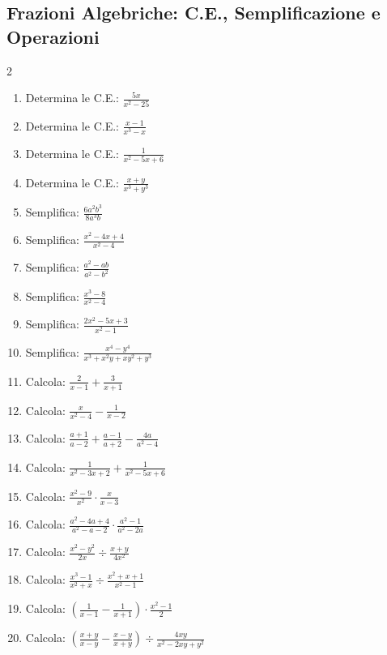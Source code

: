 \subsection{Frazioni Algebriche: C.E., Semplificazione e Operazioni}
\begin{multicols}{2}
\begin{enumerate}
    \item {} Determina le C.E.: $\frac{5x}{x^2 - 25}$
    \item {} Determina le C.E.: $\frac{x-1}{x^3 - x}$
    \item {} Determina le C.E.: $\frac{1}{x^2 - 5x + 6}$
    \item {} Determina le C.E.: $\frac{x+y}{x^3 + y^3}$
    \item {} Semplifica: $\frac{6a^2b^3}{8a^3b}$
    \item {} Semplifica: $\frac{x^2 - 4x + 4}{x^2 - 4}$
    \item {} Semplifica: $\frac{a^2 - ab}{a^2 - b^2}$
    \item {} Semplifica: $\frac{x^3 - 8}{x^2 - 4}$
    \item {} Semplifica: $\frac{2x^2 - 5x + 3}{x^2 - 1}$
    \item {} Semplifica: $\frac{x^4 - y^4}{x^3 + x^2y + xy^2 + y^3}$
    
    \item {} Calcola: $\frac{2}{x-1} + \frac{3}{x+1}$
    \item {} Calcola: $\frac{x}{x^2 - 4} - \frac{1}{x-2}$
    \item {} Calcola: $\frac{a+1}{a-2} + \frac{a-1}{a+2} - \frac{4a}{a^2-4}$
    \item {} Calcola: $\frac{1}{x^2-3x+2} + \frac{1}{x^2-5x+6}$
    \item {} Calcola: $\frac{x^2 - 9}{x^2} \cdot \frac{x}{x - 3}$
    \item {} Calcola: $\frac{a^2 - 4a + 4}{a^2 - a - 2} \cdot \frac{a^2 - 1}{a^2 - 2a}$
    \item {} Calcola: $\frac{x^2 - y^2}{2x} \div \frac{x + y}{4x^2}$
    \item {} Calcola: $\frac{x^3 - 1}{x^2 + x} \div \frac{x^2 + x + 1}{x^2 - 1}$
    \item {} Calcola: $\left( \frac{1}{x-1} - \frac{1}{x+1} \right) \cdot \frac{x^2 - 1}{2}$
    \item {} Calcola: $\left( \frac{x+y}{x-y} - \frac{x-y}{x+y} \right) \div \frac{4xy}{x^2 - 2xy + y^2}$
\end{enumerate}
\end{multicols}